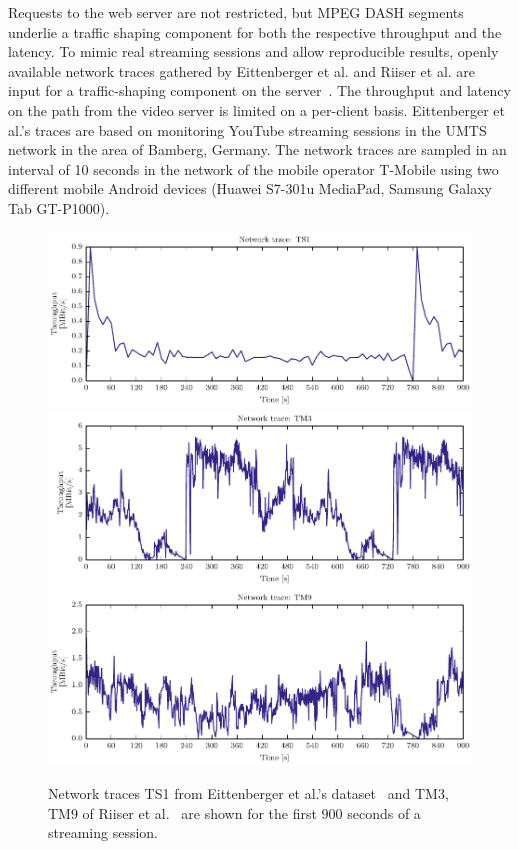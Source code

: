 Requests to the web server are not restricted, but \ac{MPEG} \ac{DASH} segments underlie a traffic shaping component for both the respective throughput and the latency.
To mimic real streaming sessions and allow reproducible results, openly available network traces gathered by Eittenberger et al. and Riiser et al. are input for a traffic-shaping component on the server~\cite{Eittenberger2013,Riiser2013}.
The throughput and latency on the path from the video server is limited on a per-client basis. 
Eittenberger et al.'s traces are based on monitoring YouTube streaming sessions in the \ac{UMTS} network in the area of Bamberg, Germany.
The network traces are sampled in an interval of 10 seconds in the network of the mobile operator T-Mobile using two different mobile Android devices (Huawei S7-301u MediaPad, Samsung Galaxy Tab GT-P1000).
\begin{figure}[!htb]
\centering
\includegraphics{./gfx/700_VAS/plotTraces_TS1}
\includegraphics{./gfx/700_VAS/plotTraces_TM3}
\includegraphics{./gfx/700_VAS/plotTraces_TM9}
\caption[Example network traces used for the VAS evaluation]{Network traces TS1 from Eittenberger et al.'s dataset~\protect\cite{Eittenberger2013} and 
TM3, TM9 of Riiser et al.~\cite{Riiser2013} are shown for the first 900 seconds of a streaming session.}
\label{fig:730_plotTOMMTraces}
\end{figure}
